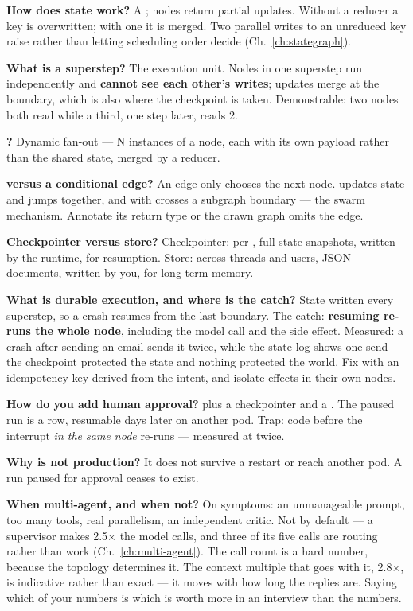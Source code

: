 \textbf{How does state work?} A ; nodes return partial updates.
Without a reducer a key is overwritten; with one it is merged. Two parallel
writes to an unreduced key raise  rather than letting
scheduling order decide (Ch.~\ref{ch:stategraph}).

\textbf{What is a superstep?} The execution unit. Nodes in one superstep run
independently and \textbf{cannot see each other's writes}; updates merge at the
boundary, which is also where the checkpoint is taken. Demonstrable: two nodes
both read  while a third, one step later, reads 2.

\textbf{?} Dynamic fan-out --- N instances of a node, each with its own
payload rather than the shared state, merged by a reducer.

\textbf{ versus a conditional edge?} An edge only chooses the next
node.  updates state and jumps together, and with
 crosses a subgraph boundary --- the swarm mechanism.
Annotate its return type or the drawn graph omits the edge.

\textbf{Checkpointer versus store?} Checkpointer: per , full
state snapshots, written by the runtime, for resumption. Store: across threads
and users, JSON documents, written by you, for long-term memory.

\textbf{What is durable execution, and where is the catch?} State written every
superstep, so a crash resumes from the last boundary. The catch: \textbf{resuming
re-runs the whole node}, including the model call and the side effect. Measured:
a crash after sending an email sends it twice, while the state log shows one send
--- the checkpoint protected the state and nothing protected the world. Fix with
an idempotency key derived from the intent, and isolate effects in their own
nodes.

\textbf{How do you add human approval?}  plus a
checkpointer and a . The paused run is a row, resumable days
later on another pod. Trap: code before the interrupt \emph{in the same node}
re-runs --- measured at twice.

\textbf{Why is  not production?} It does not survive a
restart or reach another pod. A run paused for approval ceases to exist.

\textbf{When multi-agent, and when not?} On symptoms: an unmanageable prompt, too
many tools, real parallelism, an independent critic. Not by default --- a
supervisor makes 2.5$\times$ the model calls, and three of its five calls are
routing rather than work (Ch.~\ref{ch:multi-agent}). The call count is a hard
number, because the topology determines it. The context multiple that goes with
it, 2.8$\times$, is indicative rather than exact --- it moves with how long the
replies are. Saying which of your numbers is which is worth more in an interview
than the numbers.

